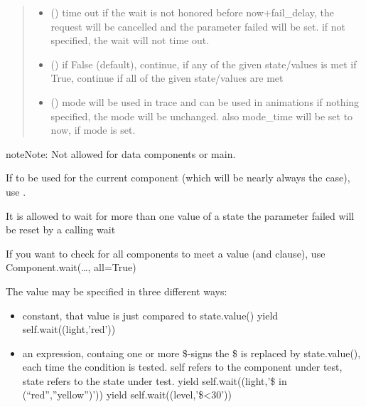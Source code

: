 \documentclass[letterpaper,10pt,english]{sphinxmanual}
\begin{document}
\begin{fulllineitems}
\begin{fulllineitems}
\begin{quote}
\begin{description}
\begin{itemize}
\item {} 
 () \textendash{} time out 
if the wait is not honored before now+fail\_delay,
the request will be cancelled and the
parameter failed will be set. 
if not specified, the wait will not time out.

\item {} 
 () \textendash{} if False (default), continue, if any of the given state/values is met 
if True, continue if all of the given state/values are met

\item {} 
 () \textendash{} mode 
will be used in trace and can be used in animations 
if nothing specified, the mode will be unchanged. 
also mode\_time will be set to now, if mode is set.

\end{itemize}

\end{description}\end{quote}

\begin{sphinxadmonition}{note}{Note:}
Not allowed for data components or main.

If to be used for the current component
(which will be nearly always the case),
use .

It is allowed to wait for more than one value of a state 
the parameter failed will be reset by a calling wait

If you want to check for all components to meet a value (and clause),
use Component.wait(…, all=True)

The value may be specified in three different ways:
\begin{itemize}
\item {} 
constant, that value is just compared to state.value() 
yield self.wait((light,’red’))

\item {} 
an expression, containg one or more \$-signs
the \$ is replaced by state.value(), each time the condition is tested. 
self refers to the component under test, state refers to the state
under test. 
yield self.wait((light,’\$ in (“red”,”yellow”)’)) 
yield self.wait((level,’\$\textless{}30’)) 


\end{itemize}
\end{sphinxadmonition}
\end{fulllineitems}
\end{fulllineitems}
\end{document}
